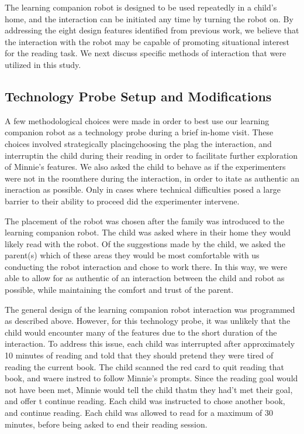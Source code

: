 \documentclass{sigchi}
\begin{document}
The learning companion robot is designed to be used repeatedly in a child's home, and the interaction can be initiated any time by turning the robot on. By addressing the eight design features identified from previous work, we believe that the interaction with the robot may be capable of promoting situational interest for the reading task. We next discuss specific methods of interaction that were utilized in this study.

\subsection{Technology Probe Setup and Modifications}
A few methodological choices were made in order to best use our learning companion robot as a technology probe during a brief in-home visit. These choices involved strategically placingchoosing the plag the interaction, and interruptin the child during their reading in order to facilitate further exploration of Minnie's features. We also asked the child to behave as if the experimenters were not in the roomthere during the interaction, in order to itate as authentic an ineraction as possible. Only in cases where technical difficulties posed a large barrier to their ability to proceed did the experimenter intervene.

The placement of the robot was chosen after the family was introduced to the learning companion robot. The child was asked where in their home they would likely read with the robot. Of the suggestions made by the child, we asked the parent(s) which of these areas they would be most comfortable with us conducting the robot interaction and chose to work there. In this way, we were able to allow for as authentic of an interaction between the child and robot as possible, while maintaining the comfort and trust of the parent. 

The general design of the learning companion robot interaction was programmed as described above. However, for this technology probe, it was unlikely that the child would encounter many of the features due to the short duration of the interaction. To address this issue, each child was interrupted after approximately 10 minutes of reading and told that they should pretend they were tired of reading the current book. The child scanned the red card to quit reading that book, and waere instred to follow Minnie's prompts. Since the reading goal would not have been met, Minnie would tell the child thatm they had't met their goal, and offer t continue reading. Each child was instructed to chose another book, and continue reading. Each child was allowed to read for a maximum of 30 minutes, before being asked to end their reading session.
\end{document}
